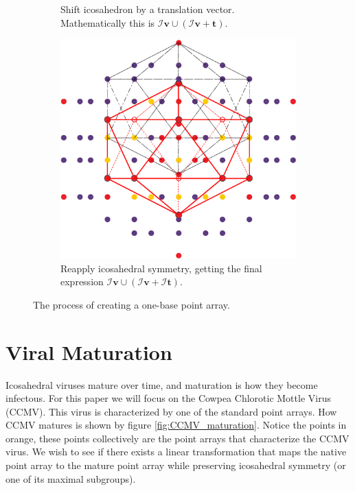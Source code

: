 \documentclass[a4paper,10pt]{article}
\theoremstyle{plain}
\theoremstyle{definition}
\theoremstyle{remark}
\renewcommand{\vec}[1]{\textbf{#1}}
\begin{document}
\begin{figure}[h]
\begin{subfigure}{0.3\textwidth}
		\caption{Shift icosahedron by a translation vector. Mathematically this is \mbox{\(\mathcal{I}\vec{v} \cup (\mathcal{I}\vec{v} + \vec{t})\)}.}
	\end{subfigure}
	\hfill
	\begin{subfigure}{0.35\textwidth}
		\centering
		\includegraphics[width=\textwidth]{images/p_arr_construction_3.pdf}
		\caption{Reapply icosahedral symmetry, getting the final expression \(\mathcal{I}\vec{v} \cup (\mathcal{I}\vec{v} + \mathcal{I}\vec{t})\).}
	\end{subfigure}
	\caption{The process of creating a one-base point array.}
	\label{fig:point_array_construction}
\end{figure}

\section{Viral Maturation}
Icosahedral viruses mature over time, and maturation is how they become infectous.
For this paper we will focus on the Cowpea Chlorotic Mottle Virus (CCMV).
This virus is characterized by one of the standard point arrays.
How CCMV matures is shown by figure \vref{fig:CCMV_maturation}.
Notice the points in orange, these points collectively are the point arrays that characterize the CCMV virus.
We wish to see if there exists a linear transformation that maps the native point array to the mature point array while preserving icosahedral symmetry (or one of its maximal subgroups).
\end{document}

